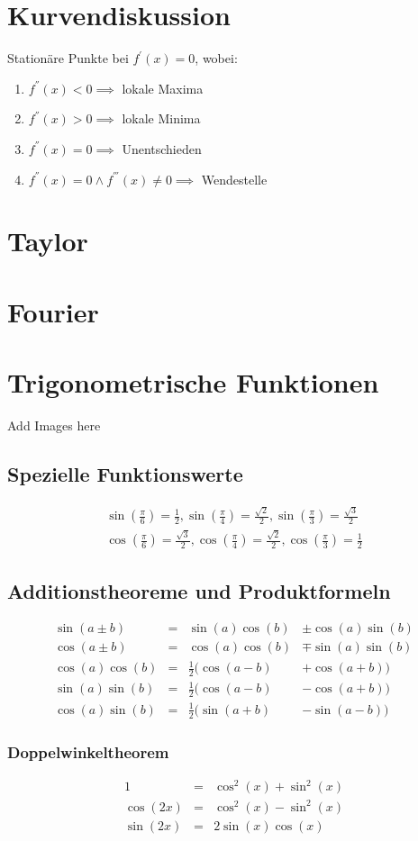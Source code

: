 \documentclass[../Main.tex]{subfiles}
\begin{document}
\section{Kurvendiskussion}
Stationäre Punkte bei \(f^{'}(x)=0 \), wobei:
\begin{enumerate}
    \item \( f^{''}(x)<0 \implies\) lokale Maxima
    \item \( f^{''}(x)>0 \implies\) lokale Minima
    \item \( f^{''}(x)=0 \implies\) Unentschieden
    \item \( f^{''}(x)=0 \land f^{'''}(x) \neq 0 \implies\) Wendestelle
\end{enumerate}
\section{Taylor}
\section{Fourier}
\section{Trigonometrische Funktionen}
Add Images here
\subsection{Spezielle Funktionswerte}
\begin{equation}
    \begin{aligned}
        \sin(\frac{\pi}{6}) = \frac{1}{2},
        \sin(\frac{\pi}{4}) = \frac{\sqrt{2}}{2},
        \sin(\frac{\pi}{3}) = \frac{\sqrt{3}}{2} \\
        \cos(\frac{\pi}{6}) = \frac{\sqrt{3}}{2},
        \cos(\frac{\pi}{4}) = \frac{\sqrt{2}}{2},
        \cos(\frac{\pi}{3}) = \frac{1}{2}
    \end{aligned}
\end{equation}
\subsection{Additionstheoreme und Produktformeln}
\begin{equation}
    \begin{aligned}
        \sin(a \pm b) &= &\sin(a) \cos(b) &\pm \cos(a) \sin(b) \\
        \cos(a \pm b) &= &\cos(a)\cos(b) &\mp \sin(a) \sin(b) \\
        \cos(a) \cos(b) &= &\frac{1}{2}(\cos(a-b) &+ \cos(a+b)) \\
        \sin(a) \sin(b) &= &\frac{1}{2}(\cos(a-b) &- \cos(a+b)) \\
        \cos(a) \sin(b) &= &\frac{1}{2}(\sin(a+b) &- \sin(a-b))
    \end{aligned}
\end{equation}
\subsubsection{Doppelwinkeltheorem}
\begin{equation}
    \begin{aligned}
        1 &= &\cos^2(x)+\sin^2(x) \\
        \cos(2x) &= &\cos^2(x)-\sin^2(x)\\
        \sin(2x) &= &2\sin(x)\cos(x)
    \end{aligned}
\end{equation}
\end{document}
